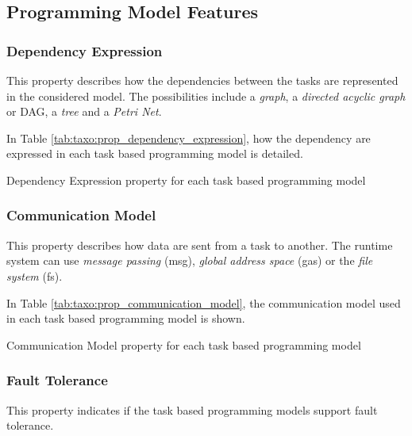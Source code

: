 \subsection{Programming Model Features}
\subsubsection{Dependency Expression}
This property describes how the dependencies between the tasks are represented in the considered model.
The possibilities include a \textit{graph}, a \textit{directed acyclic graph} or DAG, a \textit{tree} and a \textit{Petri Net}.

In Table \ref{tab:taxo:prop_dependency_expression}, how the dependency are expressed in each task based programming model is detailed.
\begin{table}[H]
	\caption{Dependency Expression property for each task based programming model \label{tab:taxo:prop_dependency_expression}}
	\centering
	\begin{multicols}{2}
		

		
	\end{multicols}
\end{table}


\subsubsection{Communication Model}
This property describes how data are sent from a task to another.
The runtime system can use \textit{message passing} (msg), \textit{global address space} (gas) or the \textit{file system} (fs).

In Table \ref{tab:taxo:prop_communication_model}, the communication model used in each task based programming model is shown.
\begin{table}[H]
	\caption{Communication Model property for each task based programming model \label{tab:taxo:prop_communication_model}}
	\centering
	\begin{multicols}{2}
		

		
	\end{multicols}
\end{table}

\subsubsection{Fault Tolerance}
This property indicates if the task based programming models support fault tolerance.

